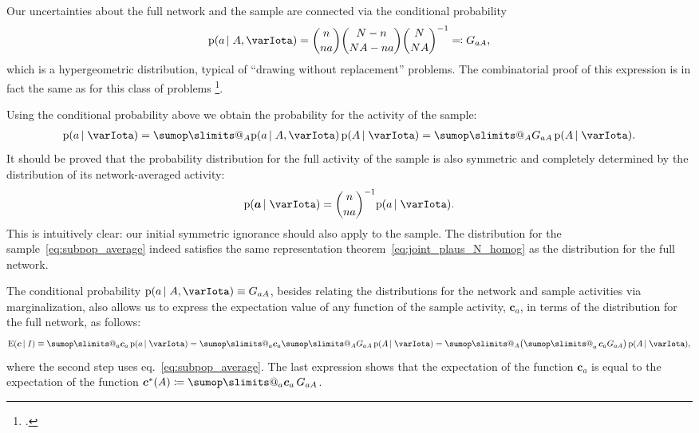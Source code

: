 \documentclass[\ifafour a4paper,12pt,\else a5paper,10pt,\fi%
onecolumn,oneside,article,%
british%
]{memoir}
\makeatletter
\theoremstyle{remark}
\theoremstyle{innote}
\def\sum{\DOTSI\sumop\slimits@}
\newcommand*{\citep}{\footcites}
\newcommand*{\defd}{\coloneqq}
\newcommand*{\defs}{\eqqcolon}
\newcommand*{\pf}{\mathrm{p}}%
\newcommand*{\p}{\mathrm{P}}%
\newcommand*{\E}{\mathrm{E}}
\renewcommand*{\|}[1][]{\nonscript\,#1\vert\nonscript\;\mathopen{}}
\newcommand*{\sect}{\S}%
\newcommand*{\chap}{ch.}%
\newcommand*{\eqn}{eq.}%
\newcommand*{\tsum}{\mathop{\textstyle\sum}\nolimits}
\newcommand*{\ypp}{G}
\newcommand*{\yAv}{A}
\newcommand*{\yav}{a}
\newcommand*{\yNv}{N}
\newcommand*{\yaa}{\bm{\yav}}%
\newcommand*{\ya}{\yav}%
\newcommand*{\yA}{\yAv}%
\newcommand*{\yH}{\varIota}
\newcommand*{\yg}{\bm{c}}
\makeatother
\begin{document}
Our uncertainties about the full network and the sample are connected
via the conditional probability
\begin{equation}
  \label{eq:conditional_hypergeometric}
  \pf(\ya \|\yA, \yH)=
  \binom{n}{n\ya}\binom{\yNv-n}{\yNv \yA-n\ya}\binom{\yNv}{\yNv \yA}^{-1}
  \defs \ypp_{\ya\yA},
\end{equation}
which is a hypergeometric distribution, typical of \enquote{drawing without
  replacement} problems. The combinatorial proof of this expression is in
fact the same as for this class of problems
\citep[\chap~3]{jaynes1994_r2003}[\sect~4.8.3]{ross1976_r2010}[\sect~II.6]{feller1950_r1968}.

Using the conditional probability above we obtain the probability for the
activity of the sample:
\begin{gather}
  \label{eq:subpop_average}
  \pf(\ya \| \yH) = \sum_{\yA}
  \pf(\ya \|\yA, \yH)\,
  \pf(\yA \| \yH)
  = 
  \sum_{\yA}
  \ypp_{\ya\yA}\,
  \pf(\yA \| \yH).
\end{gather}
It should be proved that the probability distribution for the full activity
of the sample is also symmetric and completely determined by the
distribution of its network-averaged activity:
\begin{equation}
  \label{eq:marginal}
  \pf(\yaa \| \yH) = \binom{n}{n\ya}^{-1} \pf(\ya \| \yH).
\end{equation}
This is intuitively clear: our initial symmetric ignorance should also
apply to the sample. The distribution for the
sample~\eqref{eq:subpop_average} indeed satisfies the same representation
theorem~\eqref{eq:joint_plaus_N_homog} as the distribution for the full
network.

The conditional probability
$\pf(\ya \|\yA, \yH) \equiv \ypp_{\ya \yA}$, besides
relating the distributions for the network and sample activities via
marginalization, also allows us to express the expectation value of any
function of the sample activity, $\yg_{\ya}$, in terms of the distribution
for the full network, as follows:
\begin{equation}
  \label{eq:pullback_P}
  \E(\yg\|I)
  \equiv
  \sum_{\ya} \yg_{\ya}\,\pf(\ya \| \yH)
  =
  \sum_{\ya} \yg_{\ya} \sum_{\yA} \ypp_{\ya\yA}\,\pf(\yA \| \yH)
  =%
  \sum_{\yA} \bigl( \tsum_{\ya} \yg_{\ya}  \ypp_{\ya\yA} \bigr)\,
  \pf(\yA \| \yH),
\end{equation}
where the second step uses \eqn~\eqref{eq:subpop_average}. The last
expression shows that the expectation of the function $\yg_{\ya}$ is equal to
the expectation of the function
$\yg^*(\yA) \defd \sum_{\ya} \yg_{\ya}\,\ypp_{\ya\yA}$.
\end{document}
